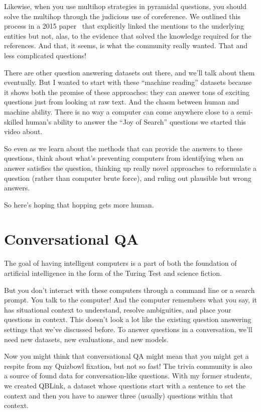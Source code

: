 Likewise, when you use multihop strategies in pyramidal questions, you should solve the multihop through the judicious use of coreference.  We outlined this process in a 2015 paper~\citep{Guha-15} that explicitly linked the mentions to the underlying entities but not, alas, to the evidence that solved the knowledge required for the references.  And that, it seems, is what the community really wanted.  That and less complicated questions!

There are other question answering datasets out there, and we’ll talk about them eventually.  But I wanted to start with these “machine reading” datasets because it shows both the promise of these approaches: they can answer tons of exciting questions just from looking at raw text.  And the chasm between human and machine ability.  There is no way a computer can come anywhere close to a semi-skilled human’s ability to answer the “Joy of Search” questions we started this video about.  

So even as we learn about the methods that can provide the answers to these questions, think about what’s preventing computers from identifying when an answer satisfies the question, thinking up really novel approaches to reformulate a question (rather than computer brute force), and ruling out plausible but wrong answers.

So here’s hoping that hopping gets more human.


\section{Conversational QA}
\label{sec:formats:conversation}

The goal of having intelligent computers is a part of both the foundation of artificial intelligence in the form of the Turing Test and science fiction.

But you don’t interact with these computers through a command line or a search prompt.  You talk to the computer!  And the computer remembers what you say, it has situational context to understand, resolve ambiguities, and place your questions in context.  
This doesn’t look a lot like the existing question answering settings that we’ve discussed before.  To answer questions in a conversation, we’ll need new datasets, new evaluations, and new models.

Now you might think that conversational QA might mean that you might get a respite from my Quizbowl fixation, but not so fast!  The trivia community is also a source of found data for conversation-like questions.  With my former students, we created QBLink, a dataset whose questions start with a sentence to set the context and then you have to answer three (usually) questions within that context.  

